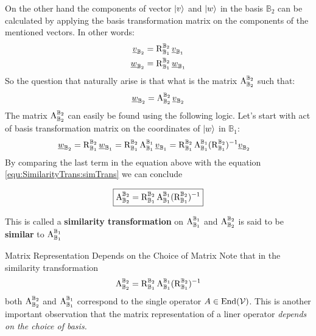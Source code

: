 On the other hand the components of vector $ \ket{v} $ and $ \ket{w} $ in the basis $ \mathbb{B}_2 $ can be calculated by applying the basis transformation matrix on the components of the mentioned vectors. In other words:
\begin{equation}
	\begin{split}
		\underline{v}_{\mathbb{B}_2}  &= \operatorname{R}_{\mathbb{B}_1}^{\mathbb{B}_2} \underline{v}_{\mathbb{B}_1} \\
		\underline{w}_{\mathbb{B}_2}  &= \operatorname{R}_{\mathbb{B}_1}^{\mathbb{B}_2} \underline{w}_{\mathbb{B}_1} 
	\end{split}
\end{equation}
So the question that naturally arise is that what is the matrix $\operatorname{A}_{\mathbb{B}_2}^{\mathbb{B}_2} $ such that:
\begin{equation}
	\underline{w}_{\mathbb{B}_2} = \operatorname{A}_{\mathbb{B}_2}^{\mathbb{B}_2}  \underline{v}_{\mathbb{B}_2} 
	\label{equ:SimilarityTrans:simTrans}
\end{equation}
The matrix $ \operatorname{A}_{\mathbb{B}_2}^{\mathbb{B}_2}  $ can easily be found using the following logic. Let's start with act of basis transformation matrix on the coordinates of $ \ket{w} $ in $ \mathbb{B}_1 $:
\begin{align*}
		\underline{w}_{\mathbb{B}_2}  &= 
		\operatorname{R}_{\mathbb{B}_1}^{\mathbb{B}_2} \underline{w}_{\mathbb{B}_1} = 
		\operatorname{R}_{\mathbb{B}_1}^{\mathbb{B}_2} \operatorname{A}_{\mathbb{B}_1}^{\mathbb{B}_1} \underline{v}_{\mathbb{B}_1}  = 
		\operatorname{R}_{\mathbb{B}_1}^{\mathbb{B}_2} \operatorname{A}_{\mathbb{B}_1}^{\mathbb{B}_1} (\operatorname{R}_{\mathbb{B}_1}^{\mathbb{B}_2})^{-1} \underline{v}_{\mathbb{B}_2}
\end{align*}
By comparing the last term in the equation above with the equation \ref{equ:SimilarityTrans:simTrans} we can conclude
\begin{LARGE}
	\begin{equation}
		\boxed{
			\operatorname{A}_{\mathbb{B}_2}^{\mathbb{B}_2} = \operatorname{R}_{\mathbb{B}_1}^{\mathbb{B}_2} \operatorname{A}_{\mathbb{B}_1}^{\mathbb{B}_1} (\operatorname{R}_{\mathbb{B}_1}^{\mathbb{B}_2})^{-1} 
		}
	\end{equation}
	\label{equ:changeOfBasis_compact}
\end{LARGE}
This is called a \textbf{similarity transformation} on $ \operatorname{A}_{\mathbb{B}_{1}}^{\mathbb{B}_{1}} $ and $ \operatorname{A}_{\mathbb{B}_{2}}^{\mathbb{B}_{2}} $ is said to be \textbf{similar} to $ \operatorname{A}_{\mathbb{B}_{1}}^{\mathbb{B}_{1}} $ 

\begin{obsbox}{Matrix Representation Depends on the Choice of Matrix}
	Note that in the similarity transformation 
	\[ \operatorname{A}_{\mathbb{B}_2}^{\mathbb{B}_2} = \operatorname{R}_{\mathbb{B}_1}^{\mathbb{B}_2} \operatorname{A}_{\mathbb{B}_1}^{\mathbb{B}_1} (\operatorname{R}_{\mathbb{B}_1}^{\mathbb{B}_2})^{-1}  \] 
	both $\operatorname{A}_{\mathbb{B}_2}^{\mathbb{B}_2} $ and $\operatorname{A}_{\mathbb{B}_1}^{\mathbb{B}_1} $ correspond to the single operator $ A \in \operatorname{End}(\mathcal{V}) $. This is another important observation that the matrix representation of a liner operator \emph{depends on the choice of basis.}
\end{obsbox}








